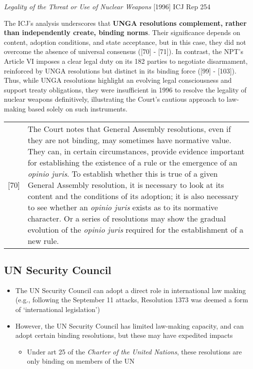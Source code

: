\begin{casedetails}{\textit{Legality of the Threat or Use of Nuclear Weapons} [1996] ICJ Rep 254}
    \vspace{\baselineskip}
    
    The ICJ's analysis underscores that \textbf{UNGA resolutions complement, rather than independently create, binding norms}. Their significance depends on content, adoption conditions, and state acceptance, but in this case, they did not overcome the absence of universal consensus ([70] - [71]). In contrast, the NPT's Article VI imposes a clear legal duty on its 182 parties to negotiate disarmament, reinforced by UNGA resolutions but distinct in its binding force ([99] - [103]). Thus, while UNGA resolutions highlight an evolving legal consciousness and support treaty obligations, they were insufficient in 1996 to resolve the legality of nuclear weapons definitively, illustrating the Court's cautious approach to law-making based solely on such instruments.

    \begin{longtable}{r|>{\raggedright\arraybackslash}p{}}
        [70] & The Court notes that General Assembly resolutions, even if they are not binding, may sometimes have normative value. They can, in certain circumstances, provide evidence important for establishing the existence of a rule or the emergence of an \textit{opinio juris}. To establish whether this is true of a given General Assembly resolution, it is necessary to look at its content and the conditions of its adoption; it is also necessary to see whether an \textit{opinio juris} exists as to its normative character. Or a series of resolutions may show the gradual evolution of the \textit{opinio juris} required for the establishment of a new rule. 
    \end{longtable}
\end{casedetails}

\subsection{UN Security Council}
\begin{itemize}
    \item The UN Security Council can adopt a direct role in international law making (e.g., following the September 11 attacks, Resolution 1373 was deemed a form of `international legislation')
    \item However, the UN Security Council has limited law-making capacity, and can adopt certain binding resolutions, but these may have expedited impacts
    \begin{itemize}
        \item Under art 25 of the \textit{Charter of the United Nations}, these resolutions are only binding on members of the UN
    \end{itemize}
\end{itemize}

